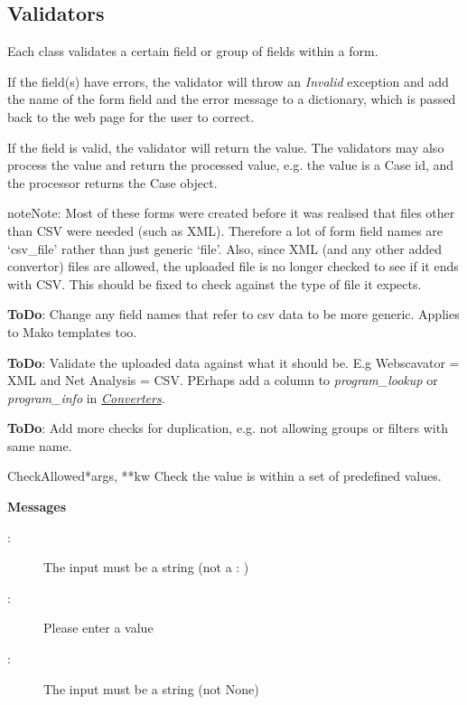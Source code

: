 \documentclass[letterpaper,10pt,english]{manual}
\begin{document}
\resetcurrentobjects
\hypertarget{--doc-validators}{}

\subsection{Validators}
\hypertarget{module-webscavator.forms.validators}{}
\modulesynopsis{}
Each class validates a certain field or group of fields within a form.

If the field(s) have errors, the validator will throw an \emph{Invalid} exception and add the 
name of the form field and the error message to a dictionary, which is passed back to the 
web page for the user to correct.

If the field is valid, the validator will return the value. 
The validators may also process the value
and return the processed value, e.g. the value is a Case id, and the processor returns the 
Case object.

\begin{notice}{note}{Note:}
Most of these forms were created before it was realised that files other than CSV were needed
(such as XML). 
Therefore a lot of form field names are `csv\_file' rather than just generic `file'. Also, since
XML (and any other added convertor) files are allowed, the uploaded file is no longer checked
to see if it ends with CSV. This should be fixed to check against the type of file it expects.

\textbf{ToDo}: Change any field names that refer to csv data to be more generic. Applies to Mako
templates too.

\textbf{ToDo}: Validate the uploaded data against what it should be. E.g Webscavator = XML and 
Net Analysis = CSV. PErhaps add a column to \emph{program\_lookup} or \emph{program\_info} in 
\hyperlink{--doc-converters}{\emph{Converters}}.

\textbf{ToDo}: Add more checks for duplication, e.g. not allowing groups or filters with same name.
\end{notice}

\hypertarget{webscavator.forms.validators.CheckAllowed}{}\begin{classdesc}{CheckAllowed}{*args, **kw}
Check the value is within a set of predefined values.

\textbf{Messages}
\begin{description}
\item[:]
The input must be a string (not a : )

\item[:]
Please enter a value

\item[:]
The input must be a string (not None)

\end{description}
\end{classdesc}
\end{document}
